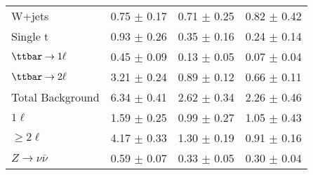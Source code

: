 \begin{table}[htb]
\begin{center}
\begin{tabular}{|l|c|c|c|}
W+jets & 0.75 $\pm$ 0.17  & 0.71 $\pm$ 0.25  & 0.82 $\pm$ 0.42 \\
Single t & 0.93 $\pm$ 0.26  & 0.35 $\pm$ 0.16  & 0.24 $\pm$ 0.14 \\ 
 $\ttbar\to1\ell$  & 0.45 $\pm$ 0.09  & 0.13 $\pm$ 0.05  & 0.07 $\pm$ 0.04 \\ 
 $\ttbar\to2\ell$  & 3.21 $\pm$ 0.24  & 0.89 $\pm$ 0.12  & 0.66 $\pm$ 0.11 \\ 
 \hline 
Total Background & 6.34 $\pm$ 0.41  & 2.62 $\pm$ 0.34  & 2.26 $\pm$ 0.46 \\ 
\hline 
$1\ell$ & 1.59 $\pm$ 0.25  & 0.99 $\pm$ 0.27  & 1.05 $\pm$ 0.43 \\
 $\geq2\ell$  & 4.17 $\pm$ 0.33  & 1.30 $\pm$ 0.19  & 0.91 $\pm$ 0.16 \\
 $Z\to\nu\bar{\nu}$  & 0.59 $\pm$ 0.07  & 0.33 $\pm$ 0.05  & 0.30 $\pm$ 0.04 \\ 
 \hline
\end{tabular}
\end{center}
\end{table}

